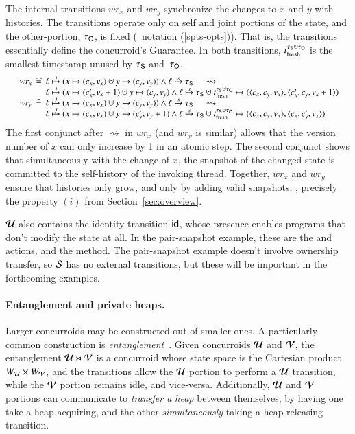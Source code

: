 The internal transitions $wr_x$ and $wr_y$ synchronize the changes to
$x$ and $y$ with histories. The transitions operate only on self and
joint portions of the state, and the other-portion, $\tau_{\mathsf{O}}$, is fixed
(\cf\ notation (\ref{spts-opts})). That is, the transitions
essentially define the concurroid's Guarantee. In both transitions,
$\tfr{\histS \hunion \histO}$ is the smallest timestamp unused by
$\tau_{\mathsf{S}}$ and~$\tau_{\mathsf{O}}$.
%
%
\[ 
{\small 
  \begin{array}{l@{\ }c@{\ }l@{\ }c}
    wr_x & \eqdef &\hps \jpts (x \hpts (c_x, v_x) \hunion y
    \hpts (c_y, v_y))  \aand 
    \hps \spts \histL ~~~~~\rightsquigarrow \\
    & &
    \hps \jpts (x \hpts (c'_x, v_x + 1) \hunion y \hpts (c_y, v_y) \aand \hps \spts \histL \hunion \tfr{\histS \hunion \histO} \hpts (\angled{c_x, c_y, v_x},\angled{c'_x, c_y, v_x+1})
    \\
    wr_y & \eqdef & \hps \jpts (x \hpts (c_x, v_x) \hunion y
    \hpts (c_y, v_y)) \aand \hps \spts \histL ~~~~~\rightsquigarrow \\
    && \hps \jpts (x \hpts (c_x, v_x) \hunion y \hpts (c'_y, v_y
    +1) \aand \hps \spts \histL \hunion \tfr{\histS \hunion \histO} \hpts (\angled{c_x, c_y, v_x},\angled{c_x, c'_y, v_x})
    \end{array}
}\] 
%
The first conjunct after $\rightsquigarrow$ in $wr_x$ (and $wr_y$ is
similar) allows that the version number of $x$ can only increase by 1
in an atomic step. The second conjunct shows that simultaneously with
the change of $x$, the snapshot of the changed state is committed to
the self-history of the invoking thread.
%
Together, $wr_x$ and $wr_y$ ensure that histories only grow, and only
by adding valid snapshots; \ie, precisely the property $(i)$ from
Section~\ref{sec:overview}.
%

$\mathcal{U}$ also contains the identity transition $\mathsf{id}$, whose presence
enables programs that don't modify the state at all. In the
pair-snapshot example, these are the  and 
actions, and the  method.  The pair-snapshot example
doesn't involve ownership transfer, so $\mathcal{S}$ has no external
transitions, but these will be important in the forthcoming examples.

\paragraph{Entanglement and private heaps.} 
Larger concurroids may be constructed out of smaller ones. A
particularly common construction is
\emph{entanglement}~\cite{Nanevski-al:ESOP14}. Given concurroids
$\mathcal{U}$ and $\mathcal{V}$, the entanglement $\mathcal{U} \rtimes \mathcal{V}$ is a
concurroid whose state space is the Cartesian product $W_{\mathcal{U}}
\times W_{\mathcal{V}}$, and the transitions allow the $\mathcal{U}$ portion to
perform a $\mathcal{U}$ transition, while the $\mathcal{V}$ portion remains idle,
and vice-versa. Additionally, $\mathcal{U}$ and $\mathcal{V}$ portions can
communicate to \emph{transfer a heap} between themselves, by having
one take a heap-acquiring, and the other \emph{simultaneously} taking
a heap-releasing transition.

